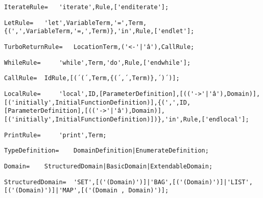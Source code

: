 \documentclass{article}
\begin{document}
    \begin{lstlisting}[mathescape=true]
     IterateRule= 	'iterate',Rule,['enditerate'];
    \end{lstlisting}
    
    \begin{lstlisting}[mathescape=true]
     LetRule= 	'let',VariableTerm,'=',Term,{(',',VariableTerm,'=,',Term)},'in',Rule,['endlet'];
    \end{lstlisting}
    
    \begin{lstlisting}[mathescape=true]
     TurboReturnRule= 	LocationTerm,('<-'|'â'),CallRule;
    \end{lstlisting}
    
    \begin{lstlisting}[mathescape=true]
     WhileRule= 	'while',Term,'do',Rule,['endwhile'];
    \end{lstlisting}
    
    \begin{lstlisting}[mathescape=true]
     CallRule= 	IdRule,[(´(´,Term,{(´,´,Term)},´)´)];
    \end{lstlisting}
    
    \begin{lstlisting}[mathescape=true]
     LocalRule= 	'local',ID,[ParameterDefinition],[(('->'|'â'),Domain)],[('initially',InitialFunctionDefinition)],{(',',ID,[ParameterDefinition],[(('->'|'â'),Domain)],[('initially',InitialFunctionDefinition)])},'in',Rule,['endlocal'];
    \end{lstlisting}
    
    \begin{lstlisting}[mathescape=true]
     PrintRule= 	'print',Term;
    \end{lstlisting}
    
    \begin{lstlisting}[mathescape=true]
     TypeDefinition= 	DomainDefinition|EnumerateDefinition;
    \end{lstlisting}
    
    \begin{lstlisting}[mathescape=true]
     Domain= 	StructuredDomain|BasicDomain|ExtendableDomain;
    \end{lstlisting}
    
    \begin{lstlisting}[mathescape=true]
     StructuredDomain= 	'SET',[('(Domain)')]|'BAG',[('(Domain)')]|'LIST',[('(Domain)')]|'MAP',[('(Domain , Domain)')];
    \end{lstlisting}
    
\end{document}
